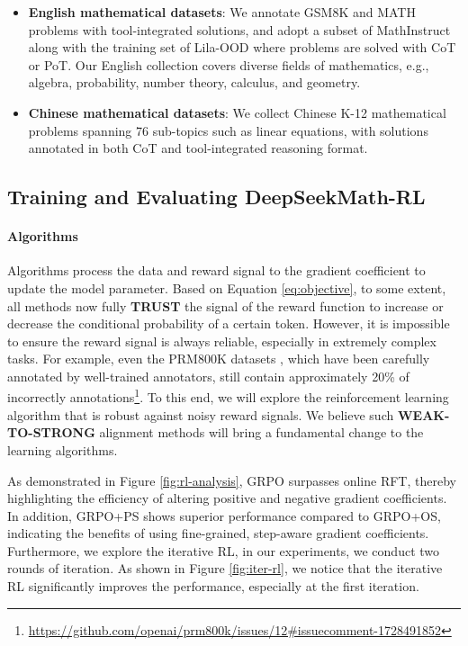 \begin{itemize}[topsep=0pt]
    \item \textbf{English mathematical datasets}: We annotate GSM8K and MATH problems with tool-integrated solutions, and adopt a subset of MathInstruct \citep{MathInstruct} along with the training set of Lila-OOD \citep{lila} where problems are solved with CoT or PoT. Our English collection covers diverse fields of mathematics, e.g., algebra, probability, number theory, calculus, and geometry.
    \item \textbf{Chinese mathematical datasets}: We collect Chinese K-12 mathematical problems spanning 76 sub-topics such as linear equations, with solutions annotated in both CoT and tool-integrated reasoning format.
\end{itemize}

\subsection{Training and Evaluating DeepSeekMath-RL}

\paragraph{Algorithms} Algorithms process the data and reward signal to the gradient coefficient to update the model parameter. Based on Equation \ref{eq:objective}, to some extent, all methods now fully \textbf{TRUST} the signal of the reward function to increase or decrease the conditional probability of a certain token. However, it is impossible to ensure the reward signal is always reliable, especially in extremely complex tasks. For example, even the PRM800K datasets \citep{lightman2023let}, which have been carefully annotated by well-trained annotators, still contain approximately 20\% of incorrectly annotations\footnote{\url{https://github.com/openai/prm800k/issues/12\#issuecomment-1728491852}}. To this end, we will explore the reinforcement learning algorithm that is robust against noisy reward signals.  We believe such \textbf{WEAK-TO-STRONG} \citep{burns2023weak} alignment methods will bring a fundamental change to the learning algorithms.

As demonstrated in Figure \ref{fig:rl-analysis}, GRPO surpasses online RFT, thereby highlighting the efficiency of altering positive and negative gradient coefficients. In addition, GRPO+PS shows superior performance compared to GRPO+OS, indicating the benefits of using fine-grained, step-aware gradient coefficients. Furthermore, we explore the iterative RL, in our experiments, we conduct two rounds of iteration. As shown in Figure \ref{fig:iter-rl}, we notice that the iterative RL significantly improves the performance, especially at the first iteration.

